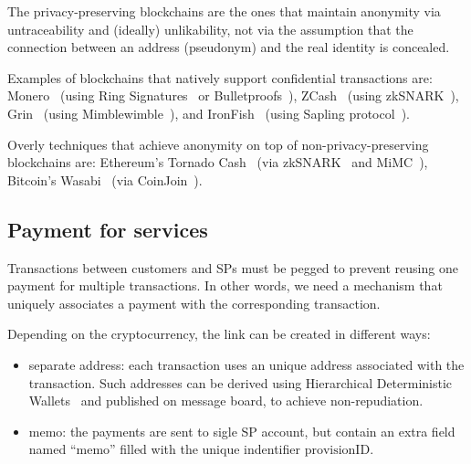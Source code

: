 The privacy-preserving blockchains are the ones that maintain anonymity via untraceability and (ideally) unlikability, not via the assumption that the connection between an address (pseudonym) and the real identity is concealed.   

Examples of blockchains that natively support confidential transactions are: Monero~\cite{vansaberhagenCryptoNote2013} (using Ring Signatures~\cite{noetherRingSignatureConfidential2015} or Bulletproofs~\cite{bunzBulletproofsShortProofs2018}), ZCash~\cite{ben-sassonZerocashDecentralizedAnonymous2014} (using zkSNARK~\cite{ben-sassonSNARKsVerifyingProgram2013}), Grin~\cite{fuchsbauerAggregateCashSystems2019} (using Mimblewimble~\cite{jedusorMIMBLEWIMBLE2016}), and IronFish~\cite{ironfishPrivateAnonymousEasy} (using Sapling protocol~\cite{hopwoodZcashSaplingProtocol2022}).

Overly techniques that achieve anonymity on top of non-privacy-preserving blockchains are: Ethereum's Tornado Cash~\cite{pertsevTornadoCashPrivacy2019} (via zkSNARK~\cite{grothSizePairingbasedNoninteractive2016} and MiMC~\cite{albrechtMiMCEfficientEncryption2016}), Bitcoin's Wasabi~\cite{wasabiwalletBitcoinPrivacyWallet} (via CoinJoin~\cite{maxwellCoinJoinBitcoinPrivacy2013}).

\subsection{Payment for services}\label{payment-for-services}
Transactions between customers and SPs must be pegged to prevent reusing one payment for multiple transactions. 
In other words, we need a mechanism that uniquely associates a payment with the corresponding transaction.

Depending on the cryptocurrency, the link can be created in different
ways:

\begin{itemize}

\item separate address: each transaction uses an unique address associated with the transaction. Such addresses can be derived using Hierarchical Deterministic Wallets~\cite{wuilleBIP32HierarchicalDeterministic2012} and published on message board, to achieve non-repudiation.
\item memo: the payments are sent to sigle SP account, but contain an extra field named ``memo'' filled with the unique indentifier $\textrm{provisionID}$. 
\end{itemize}

